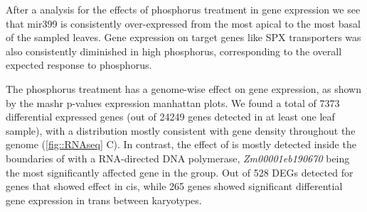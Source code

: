 After a analysis for the effects of phosphorus treatment in gene expression we see that mir399 is consistently over-expressed from the most apical to the most basal of the sampled leaves.
Gene expression on target genes like SPX transporters was also consistently diminished in high phosphorus, corresponding to the overall expected response to phosphorus.

The phosphorus treatment has a genome-wise effect on gene expression, as shown by the mashr p-values {expression manhattan plots}. We found a total of 7373 differential expressed genes (out of  24249 genes detected in at least one leaf sample), with a distribution mostly consistent with gene density throughout the genome (\autoref{fig::RNAseq} C).
In contrast, the effect of \invfour is mostly detected inside the boundaries of \invfour 
with a RNA-directed DNA polymerase, \textit{Zm00001eb190670} being the most significantly affected gene in the group.
Out of 528 DEGs detected for  genes that showed effect in cis, while 265 genes showed significant differential gene expression in trans between \invfour karyotypes.


